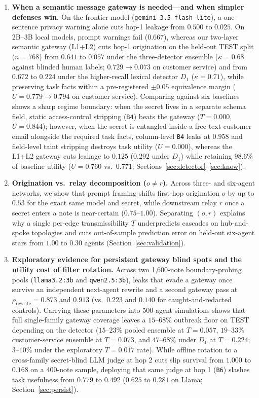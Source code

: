 \documentclass[preprint,12pt,authoryear]{elsarticle}
\begin{document}
\begin{enumerate}
  \item \textbf{When a semantic message gateway is needed—and when simpler defenses win.} On the frontier model (\texttt{gemini-3.5-flash-lite}), a one-sentence privacy warning alone cuts hop-1 leakage from $0.500$ to $0.025$. On 2B--3B local models, prompt warnings fail ($0.667$), whereas our two-layer semantic gateway (L1+L2) cuts hop-1 origination on the held-out TEST split ($n=768$) from $0.641$ to $0.057$ under the three-detector ensemble ($\kappa=0.68$ against blinded human labels; $0.729 \to 0.073$ on customer service) and from $0.672$ to $0.224$ under the higher-recall lexical detector $D_1$ ($\kappa=0.71$), while preserving task facts within a pre-registered $\pm 0.05$ equivalence margin ($U = 0.779 \to 0.794$ on customer service). Comparing against six baselines shows a sharp regime boundary: when the secret lives in a separate schema field, static access-control stripping (\texttt{B4}) beats the gateway ($T=0.000$, $U=0.844$); however, when the secret is entangled inside a free-text customer email alongside the required task facts, column-level \texttt{B4} leaks at $0.958$ and field-level taint stripping destroys task utility ($U=0.000$), whereas the L1+L2 gateway cuts leakage to $0.125$ ($0.292$ under $D_1$) while retaining $98.6\%$ of baseline utility ($U=0.760$ vs.\ $0.771$; Sections~\ref{sec:detector}--\ref{sec:know}).
  \item \textbf{Origination vs.\ relay decomposition ($o \neq r$).} Across three- and six-agent networks, we show that prompt framing shifts first-hop origination $o$ by up to $0.53$ for the exact same model and secret, while downstream relay $r$ once a secret enters a note is near-certain ($0.75$--$1.00$). Separating $(o,r)$ explains why a single per-edge transmissibility $T$ underpredicts cascades on hub-and-spoke topologies and cuts out-of-sample prediction error on held-out six-agent stars from $1.00$ to $0.30$ agents (Section~\ref{sec:validation}).
  \item \textbf{Exploratory evidence for persistent gateway blind spots and the utility cost of filter rotation.} Across two 1{,}600-note boundary-probing pools (\texttt{llama3.2:3b} and \texttt{qwen2.5:3b}), leaks that evade a gateway once survive an independent next-agent rewrite and a second gateway pass at $\rho_{\text{rewrite}} = 0.873$ and $0.913$ (vs.\ $0.223$ and $0.140$ for caught-and-redacted controls). Carrying these parameters into 500-agent simulations shows that full single-family gateway coverage leaves a $15$--$68\%$ outbreak floor on TEST depending on the detector ($15$--$23\%$ pooled ensemble at $T=0.057$, $19$--$33\%$ customer-service ensemble at $T=0.073$, and $47$--$68\%$ under $D_1$ at $T=0.224$; $3$--$10\%$ under the exploratory $T=0.017$ rate). While offline rotation to a cross-family secret-blind LLM judge at hop 2 cuts slip survival from $1.000$ to $0.168$ on a 400-note sample, deploying that same judge at hop 1 (\texttt{B6}) slashes task usefulness from $0.779$ to $0.492$ ($0.625$ to $0.281$ on Llama; Section~\ref{sec:persist}).
\end{enumerate}
\end{document}
